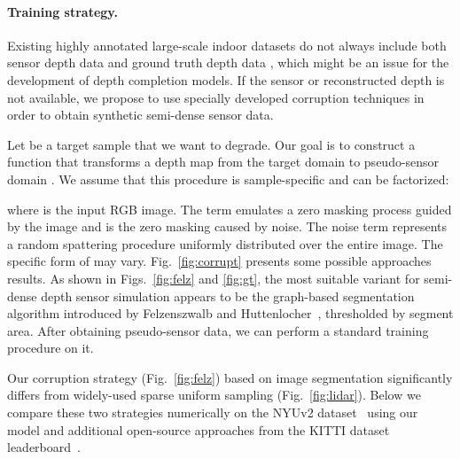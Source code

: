 \documentclass[final]{cvpr}
\begin{document}
    \paragraph{Training strategy.}
    Existing highly annotated large-scale indoor datasets do not always include both sensor depth data and ground truth depth data \cite{taskonomy2018, nyuv2}, which might be an issue for the development of depth completion models. If the sensor or reconstructed depth is not available, we propose to use specially developed corruption techniques in order to obtain synthetic semi-dense sensor data.
    
    Let  be a target sample that we want to degrade. Our goal is to construct a function  that transforms a depth map from the target domain  to pseudo-sensor domain . We assume that this procedure is sample-specific and can be factorized:

where  is the input RGB image. The term  emulates a zero masking process guided by the image and  is the zero masking caused by noise. The noise term  represents a random spattering procedure uniformly distributed over the entire image. The specific form of  may vary. Fig.~\ref{fig:corrupt} presents some possible approaches results. As shown in Figs.~\ref{fig:felz} and \ref{fig:gt}, the most suitable variant for semi-dense depth sensor simulation appears to be the graph-based segmentation algorithm introduced by Felzenszwalb and Huttenlocher~\cite{felzenszwalb}, thresholded by segment area. After obtaining pseudo-sensor data, we can perform a standard training procedure on it.
 
    Our corruption strategy (Fig.~\ref{fig:felz}) based on image segmentation significantly differs from widely-used sparse uniform sampling (Fig.~\ref{fig:lidar}). Below we compare these two strategies numerically on the NYUv2 dataset~\cite{nyuv2} using our model and additional open-source approaches from the KITTI dataset leaderboard~\cite{uhrig}. 
    
\end{document}
